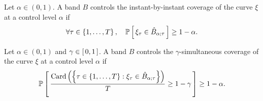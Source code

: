 \documentclass[11pt]{article}
\begin{document}
\begin{definition}
    Let $\alpha \in (0, 1)$.
    A band $B$ controls the instant-by-instant coverage of the curve $\xi$ at a control level $\alpha$
    if
    \begin{align*}
        \forall \tau \in \left\{ 1, \ldots, T \right\},
        \quad
        \mathbb{P}\left[\, \xi_\tau \in \hat{B}_{\alpha; \tau} \,\right] \geq 1 - \alpha.
    \end{align*}
\end{definition}


\begin{definition}
    Let $\alpha \in (0, 1)$ and $\gamma \in \left[\, 0, 1 \,\right]$.
    A band $B$ controls the $\gamma$-simultaneous coverage of the curve $\xi$ at a control level $\alpha$
    if
    \begin{align*}
        \mathbb{P}\left[\, 
            \frac{\mathrm{Card} \left( 
                \left\{ 
                    \tau \in \left\{ 1, \ldots, T \right\}:
                    \xi_\tau \in \hat{B}_{\alpha; \tau}
                 \right\}
             \right)}{T}
            \geq 1 - \gamma
         \,\right] \geq 1 - \alpha.
    \end{align*}
\end{definition}
\end{document}

